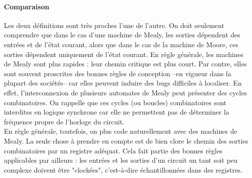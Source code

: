 \paragraph{Comparaison}
Les deux définitions sont très proches l'une de l'autre. On doit seulement comprendre que dans le cas d'une machine de Mealy, les sorties
dépendent des entrées et de l'état courant, alors que dans le cas de la machine de Moore, ces sorties dépendent uniquement de l'état courant.
En règle générale, les machines de Mealy sont plus rapides : leur chemin critique est plus court. Par contre, elles sont souvent proscrites des
bonnes règles de conception --en vigueur dans la plupart des sociétés-- car elles peuvent induire des bugs difficiles à localiser. En effet,
l'interconnexion de plusieurs automates de Mealy peut présenter des cycles combinatoires. On rappelle que ces cycles (ou boucles) combinatoires
sont interdites en logique synchrone car elle ne permettent pas de déterminer la fréquence propre de l'horloge du circuit.\\

En règle générale, toutefois, on plus code naturellement avec des machines de Mealy. La seule chose à prendre en compte est de bien clore le chemin
des sorties combinatoires par un registre adéquat. Cela fait partie des bonnes règles applicables par ailleurs : les entrées et les sorties d'un circuit
un tant soit peu complexe doivent être "clockées", c'est-à-dire échantillonnées dans des registres.


